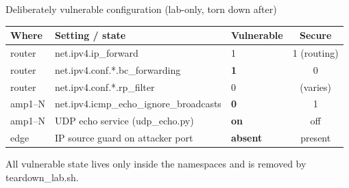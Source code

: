 \documentclass[aspectratio=169,10pt]{beamer}
\newcommand{\code}[1]{{\ttfamily #1}}
\begin{document}
\begin{frame}{Deliberately vulnerable configuration (lab-only, torn down after)}
  \centering
  \small
  \begin{tabular}{@{}lllc@{}}
    \toprule
    \textbf{Where} & \textbf{Setting / state} & \textbf{Vulnerable} & \textbf{Secure} \\
    \midrule
    router  & \code{net.ipv4.ip\_forward}                    & 1 & 1 (routing) \\
    router  & \code{net.ipv4.conf.*.bc\_forwarding}          & \textcolor{attc}{\textbf{1}} & 0 \\
    router  & \code{net.ipv4.conf.*.rp\_filter}              & 0 & (varies) \\
    amp1--N & \code{net.ipv4.icmp\_echo\_ignore\_broadcasts} & \textcolor{attc}{\textbf{0}} & 1 \\
    amp1--N & UDP echo service (\code{udp\_echo.py})          & \textcolor{attc}{\textbf{on}} & off \\
    edge    & IP source guard on attacker port               & \textcolor{attc}{\textbf{absent}} & present \\
    \bottomrule
  \end{tabular}

  \vspace{6pt}
  \footnotesize All vulnerable state lives only inside the namespaces and is removed by
  \code{teardown\_lab.sh}.
\end{frame}

\end{document}
